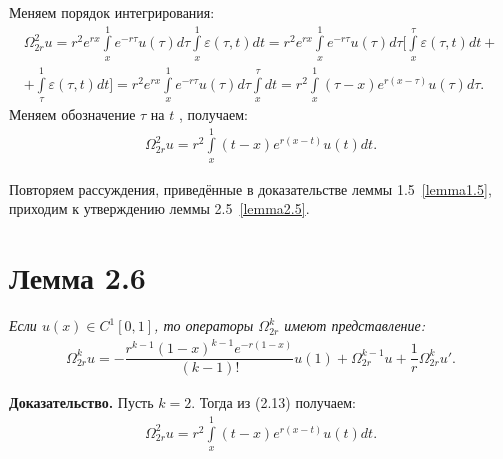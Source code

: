 Меняем порядок интегрирования:
\begin{equation}
\begin{array}{c}
\nonumber

\Omega_{2r}^2u = r^2e^{rx} \int\limits_x^1 e^{-r\tau}u(\tau)d\tau \int\limits_x^1 \varepsilon (\tau ,t) dt = r^2e^{rx} \int\limits_x^1 e^{-r\tau}u(\tau)d\tau \biggl[ \int\limits_x^{\tau} \varepsilon (\tau ,t)dt + \\ + \int\limits_{\tau}^1 \varepsilon (\tau ,t)dt \biggr] = r^2e^{rx} \int\limits_x^1 e^{-r\tau}u(\tau)d\tau \int\limits_x^{\tau}dt = r^2 \int\limits_x^1(\tau - x)e^{r(x-\tau)}u(\tau)d\tau .

\end{array}
\end{equation}
Меняем обозначение $ \tau $ на $ t $ , получаем:
\begin{equation}
\begin{array}{c}

\Omega_{2r}^2u = r^2\int\limits_x^1 (t-x)e^{r(x-t)}u(t)dt.

\end{array}
\end{equation}

Повторяем рассуждения, приведённые в доказательстве леммы 1.5~\eqref{lemma1.5}, приходим к утверждению леммы 2.5~\eqref{lemma2.5}.

\section{Лемма 2.6}
\label{lemma2.6}
\textit{Если $ u(x) \in C^1[0,1] $, то операторы $ \Omega_{2r}^k $ имеют представление:}
\begin{equation}
\begin{array}{c}

\Omega_{2r}^ku = -\dfrac{r^{k-1}(1-x)^{k-1}e^{-r(1-x)}}{(k-1)!}u(1) + \Omega_{2r}^{k-1}u + \dfrac{1}{r}\Omega_{2r}^ku'.

\end{array}
\end{equation}

\textbf{Доказательство.} Пусть $ k = 2 $. Тогда из (2.13) получаем:
\begin{equation}
\begin{array}{c}
\nonumber

\Omega_{2r}^2u = r^2\int\limits_x^1 (t-x)e^{r(x-t)}u(t)dt.

\end{array}
\end{equation}

